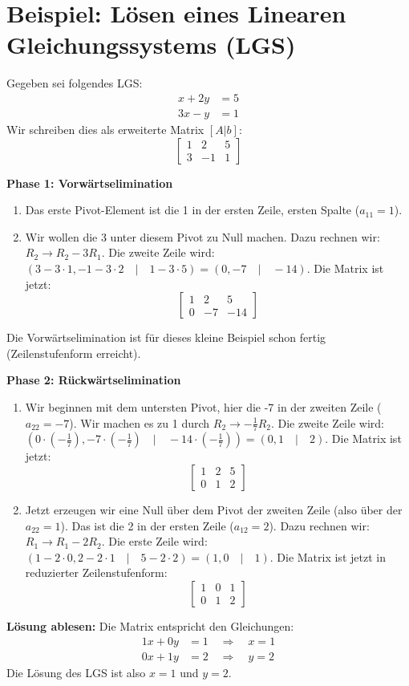 \section{Beispiel: Lösen eines Linearen Gleichungssystems (LGS)}
Gegeben sei folgendes LGS:
\begin{align*}
    x + 2y & = 5 \\
    3x - y & = 1
\end{align*}
Wir schreiben dies als erweiterte Matrix $[A|b]$:
$$ \left[ \begin{array}{cc|c}
            1 & 2  & 5 \\
            3 & -1 & 1
        \end{array} \right] $$

\textbf{Phase 1: Vorwärtselimination}
\begin{enumerate}
    \item Das erste Pivot-Element ist die 1 in der ersten Zeile, ersten Spalte
          ($a_{11}=1$).
    \item Wir wollen die 3 unter diesem Pivot zu Null machen. Dazu rechnen wir: $R_2
              \rightarrow R_2 - 3R_1$. Die zweite Zeile wird: $(3 - 3 \cdot 1, -1 - 3 \cdot 2
              \quad | \quad 1 - 3 \cdot 5) = (0, -7 \quad | \quad -14)$. Die Matrix ist
          jetzt: $$ \left[ \begin{array}{cc|c}
                      1 & 2  & 5   \\
                      0 & -7 & -14
                  \end{array} \right] $$
\end{enumerate}
Die Vorwärtselimination ist für dieses kleine Beispiel schon fertig (Zeilenstufenform erreicht).

\textbf{Phase 2: Rückwärtselimination}
\begin{enumerate}
    \item Wir beginnen mit dem untersten Pivot, hier die -7 in der zweiten Zeile
          ($a_{22}=-7$). Wir machen es zu 1 durch $R_2 \rightarrow -\frac{1}{7}R_2$. Die
          zweite Zeile wird: $(0 \cdot (-\frac{1}{7}), -7 \cdot (-\frac{1}{7}) \quad |
              \quad -14 \cdot (-\frac{1}{7})) = (0, 1 \quad | \quad 2)$. Die Matrix ist
          jetzt: $$ \left[ \begin{array}{cc|c}
                      1 & 2 & 5 \\
                      0 & 1 & 2
                  \end{array} \right] $$
    \item Jetzt erzeugen wir eine Null über dem Pivot der zweiten Zeile (also über der
          $a_{22}=1$). Das ist die 2 in der ersten Zeile ($a_{12}=2$). Dazu rechnen wir:
          $R_1 \rightarrow R_1 - 2R_2$. Die erste Zeile wird: $(1 - 2 \cdot 0, 2 - 2
              \cdot 1 \quad | \quad 5 - 2 \cdot 2) = (1, 0 \quad | \quad 1)$. Die Matrix ist
          jetzt in reduzierter Zeilenstufenform: $$ \left[ \begin{array}{cc|c}
                      1 & 0 & 1 \\
                      0 & 1 & 2
                  \end{array} \right] $$
\end{enumerate}

\textbf{Lösung ablesen:}
Die Matrix entspricht den Gleichungen:
\begin{align*}
    1x + 0y & = 1 \quad \Rightarrow \quad x = 1 \\
    0x + 1y & = 2 \quad \Rightarrow \quad y = 2
\end{align*}
Die Lösung des LGS ist also $x=1$ und $y=2$.